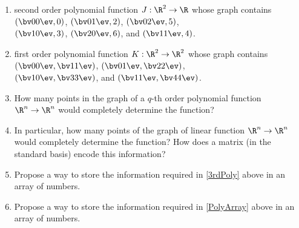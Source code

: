 \begin{enumerate}
\begin{enumerate}
\item second order polynomial function $J:\R^2 \to \R $ whose graph contains 
$\left(  \bv 0\\0 \ev , 0\right)$,  %
$\left(  \bv 0\\1 \ev , 2\right)$, %
$\left(  \bv 0\\2 \ev , 5\right)$, \\[.2cm]
$\left(  \bv 1\\0 \ev , 3\right)$,   %
$\left(  \bv 2\\0 \ev , 6\right)$,  and %
$\left(  \bv 1\\1 \ev , 4\right)$. %

\item  first order polynomial function $K:\R^2 \to \R^2 $ whose graph contains 
$\left(  \bv 0\\0 \ev , \bv 1\\1 \ev \right)$, 
$\left(  \bv 0\\1 \ev , \bv 2\\2 \ev\right)$, \\[.2cm]
$\left(  \bv 1\\0 \ev , \bv 3\\3 \ev  \right)$,  and
$\left(  \bv 1\\1 \ev , \bv 4\\4 \ev\right)$.
\\

\item \label{PolyArray}How many points in the graph of a $q$-th order polynomial function $\R^n \to \R^n$ would completely determine the function? 


\item In particular, how many points of the graph of linear function $\R^n \to \R^n$ would completely determine the function? How does a matrix (in the standard basis) encode this information?

\item Propose a way to store the information required in \ref{3rdPoly} above in an array of numbers.

\item Propose a way to store the information required in \ref{PolyArray} above in an array of numbers.
\end{enumerate}






\end{enumerate}

